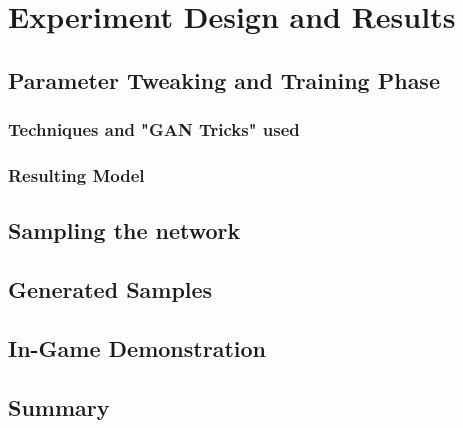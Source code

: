 \chapter{Experiment Design and Results}
\section{Parameter Tweaking and Training Phase}
\subsection{Techniques and "GAN Tricks" used}
\subsection{Resulting Model}
\section{Sampling the network}
\section{Generated Samples}
\section{In-Game Demonstration}
\section{Summary}